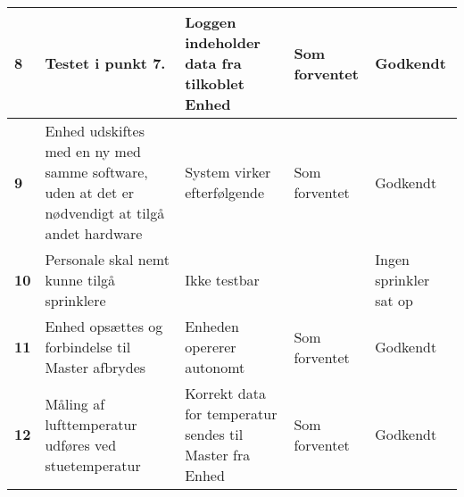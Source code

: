 \begin{center}
\begin{longtable}{|p{}|p{}|p{}|p{}|p{}|}
\textbf{8}	&Testet i punkt 7.
			&Loggen indeholder data fra tilkoblet Enhed
			& Som \newline forventet
			&Godkendt \\ \hline 
						
\textbf{9}	&Enhed udskiftes med en ny med samme software, uden at det er nødvendigt at tilgå andet hardware
			&System virker efterfølgende
			& Som \newline forventet
			&Godkendt\\ \hline 
			
\textbf{10}	&Personale skal nemt kunne tilgå sprinklere
			&Ikke testbar
			&
			&Ingen sprinkler sat op\\ \hline 
			
			
\textbf{11}	&Enhed opsættes og forbindelse til Master afbrydes
			&Enheden opererer autonomt
			& Som \newline forventet
			&Godkendt\\ \hline 
			
\textbf{12}	&Måling af lufttemperatur udføres ved stuetemperatur
			&Korrekt data for temperatur sendes til Master fra Enhed
			&Som \newline forventet
			&Godkendt\\ \hline 

\end{longtable}
	\label{ATIFKrav} 
\end{center}


